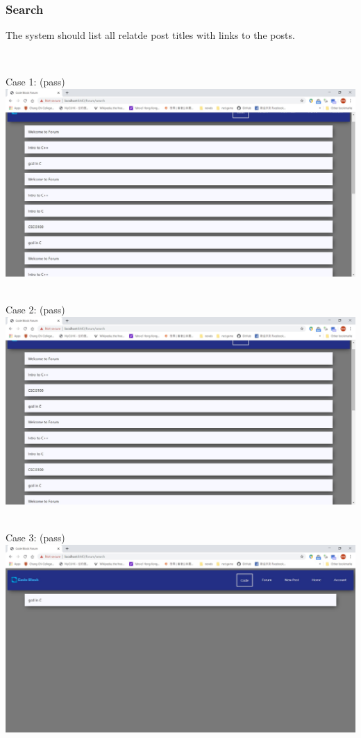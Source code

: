 ~

\subsubsection{Search}
The system should list all relatde post titles with links to the posts.

~

Case 1: (pass)\\
\includegraphics[scale=0.45]{Doc/Pics/case-8-4-1}\\

~

Case 2: (pass)\\
\includegraphics[scale=0.45]{Doc/Pics/case-8-4-2}\\

~

Case 3: (pass)\\
\includegraphics[scale=0.45]{Doc/Pics/case-8-4-3}\\

